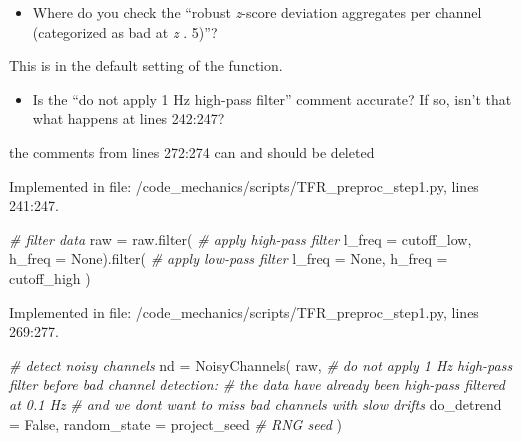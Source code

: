 \documentclass[
  man,floatsintext]{apa6}
\newenvironment{Shaded}{\begin{snugshade}}{\end{snugshade}}
\newcommand{\AttributeTok}[1]{\textcolor[rgb]{0.77,0.63,0.00}{#1}}
\newcommand{\CommentTok}[1]{\textcolor[rgb]{0.56,0.35,0.01}{\textit{#1}}}
\newcommand{\FunctionTok}[1]{\textcolor[rgb]{0.00,0.00,0.00}{#1}}
\newcommand{\NormalTok}[1]{#1}
\newcommand{\OtherTok}[1]{\textcolor[rgb]{0.56,0.35,0.01}{#1}}
\providecommand{\tightlist}{%
  \setlength{\itemsep}{0pt}\setlength{\parskip}{0pt}}
\begin{document}
\begin{itemize}
\tightlist
\item
  Where do you check the ``robust \emph{z}-score deviation aggregates per channel (categorized as bad at \emph{z} . 5)''?
\end{itemize}

This is in the default setting of the function.

\begin{itemize}
\tightlist
\item
  Is the ``do not apply 1 Hz high-pass filter'' comment accurate? If so, isn't that what happens at lines 242:247?
\end{itemize}

the comments from lines 272:274 can and should be deleted

Implemented in file: /code\_mechanics/scripts/TFR\_preproc\_step1.py, lines 241:247.

\begin{Shaded}
\begin{Highlighting}[]
        \CommentTok{\# filter data}
\NormalTok{        raw }\OtherTok{=} \FunctionTok{raw.filter}\NormalTok{( }\CommentTok{\# apply high{-}pass filter}
            \AttributeTok{l\_freq =}\NormalTok{ cutoff\_low,}
            \AttributeTok{h\_freq =}\NormalTok{ None)}\FunctionTok{.filter}\NormalTok{( }\CommentTok{\# apply low{-}pass filter}
                \AttributeTok{l\_freq =}\NormalTok{ None,}
                \AttributeTok{h\_freq =}\NormalTok{ cutoff\_high}
\NormalTok{                )}
\end{Highlighting}
\end{Shaded}

Implemented in file: /code\_mechanics/scripts/TFR\_preproc\_step1.py, lines 269:277.

\begin{Shaded}
\begin{Highlighting}[]
        \CommentTok{\# detect noisy channels}
\NormalTok{        nd }\OtherTok{=} \FunctionTok{NoisyChannels}\NormalTok{(}
\NormalTok{            raw,}
            \CommentTok{\# do not apply 1 Hz high{-}pass filter before bad channel detection:}
            \CommentTok{\# the data have already been high{-}pass filtered at 0.1 Hz}
            \CommentTok{\# and we don\textquotesingle{}t want to miss bad channels with slow drifts}
            \AttributeTok{do\_detrend =}\NormalTok{ False,}
            \AttributeTok{random\_state =}\NormalTok{ project\_seed }\CommentTok{\# RNG seed}
\NormalTok{            )}
\end{Highlighting}
\end{Shaded}
\end{document}
